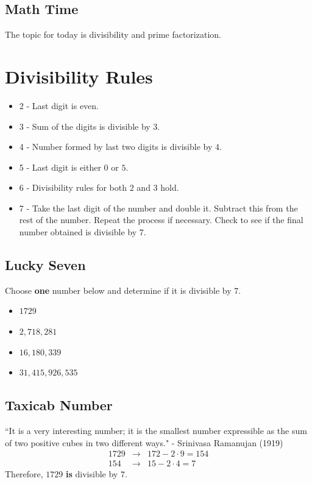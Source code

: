 \clearpage  

\subsection{Math Time}

The topic for today is divisibility and prime factorization.  %

\clearpage

\section{Divisibility Rules}

\begin{itemize}
\item  2 - Last digit is even. 
\item  3 - Sum of the digits is divisible by 3.
\item 4  - Number formed by last two digits is divisible by 4.
\item 5 - Last digit is either $0$ or $5$.
\item 6 -  Divisibility rules for both $2$ and $3$ hold.
\item 7  - Take the last digit of the number and double it.  Subtract this from the rest of the number.  Repeat the process if necessary.  Check to see if the final number obtained is divisible by $7$. \cite{a:1} 
\end{itemize}




\clearpage

\subsection*{Lucky Seven}

Choose \textbf{one} number below and determine if it is divisible by $7$.
\begin{itemize}
	\item $1729$
	\item $2,718,281$
	\item $16,180,339$
	\item $31,415,926,535$
\end{itemize}

\subsection*{Taxicab Number}

``It is a very interesting number; it is the smallest number expressible as the sum of two positive cubes in two different ways." -  Srinivasa Ramanujan (1919)
\begin{eqnarray*}
	1729 &\to& 172-2\cdot 9=154 \\ 
	154 &\to& 15-2\cdot 4=7
\end{eqnarray*}
Therefore, $1729$ \textbf{is} divisible by $7$.

